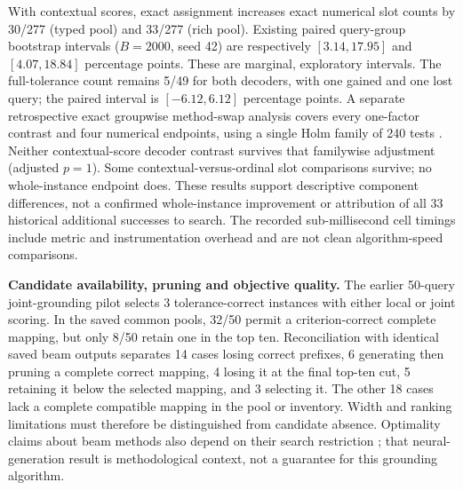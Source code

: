 With contextual scores, exact assignment increases exact numerical slot
counts by 30/277 (typed pool) and 33/277 (rich pool). Existing paired
query-group bootstrap intervals ($B=2000$, seed 42) are respectively
$[3.14,17.95]$ and $[4.07,18.84]$ percentage points. These are marginal,
exploratory intervals. The full-tolerance count remains 5/49 for both
decoders, with one gained and one lost query; the paired interval is
$[-6.12,6.12]$ percentage points. A separate retrospective exact groupwise
method-swap analysis covers every one-factor contrast and four numerical
endpoints, using a single Holm family of 240 tests
\cite{holm1979followup}. Neither contextual-score decoder contrast survives
that familywise adjustment (adjusted $p=1$). Some contextual-versus-ordinal
slot comparisons survive; no whole-instance endpoint does. These results
support descriptive component differences, not a confirmed whole-instance
improvement or attribution of all 33 historical additional successes to
search. The recorded sub-millisecond cell timings include metric and
instrumentation overhead and are not clean algorithm-speed comparisons.

\medskip\noindent\textbf{Candidate availability, pruning and objective quality.}
The earlier 50-query joint-grounding pilot selects 3 tolerance-correct
instances with either local or joint scoring. In the saved common pools,
32/50 permit a criterion-correct complete mapping, but only 8/50 retain one
in the top ten. Reconciliation with identical saved beam outputs separates
14 cases losing correct prefixes, 6 generating then pruning a complete
correct mapping, 4 losing it at the final top-ten cut, 5 retaining it below
the selected mapping, and 3 selecting it. The other 18 cases lack a complete
compatible mapping in the pool or inventory. Width and ranking limitations
must therefore be distinguished from candidate absence. Optimality claims
about beam methods also depend on their search restriction
\cite{huang2017beamfollowup}; that neural-generation result is methodological
context, not a guarantee for this grounding algorithm.

